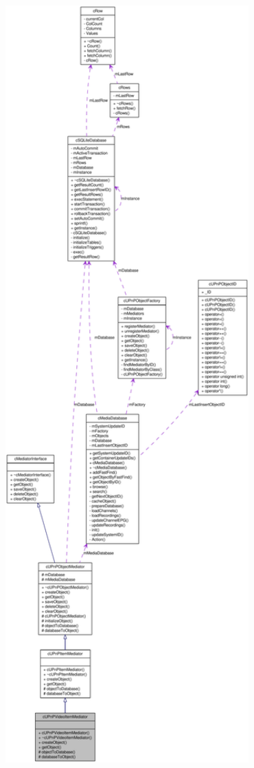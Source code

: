 \begin{figure}[H]
\begin{center}
\leavevmode
\includegraphics[width=400pt]{classcUPnPVideoItemMediator__coll__graph}
\end{center}
\end{figure}
